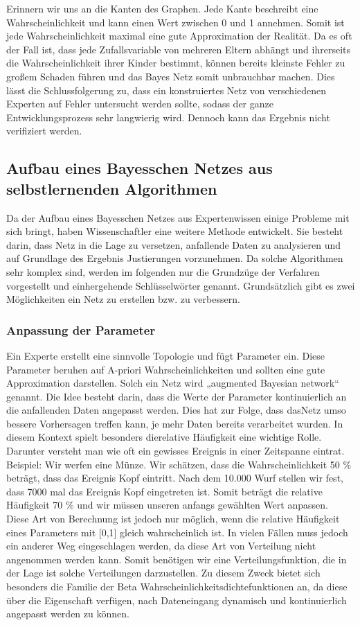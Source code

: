 Erinnern wir uns an die Kanten des Graphen. Jede Kante beschreibt eine Wahrscheinlichkeit und  kann einen Wert zwischen 0 und 1 annehmen.
Somit ist jede Wahrscheinlichkeit maximal eine gute Approximation der Realität. Da es oft der Fall ist, dass jede Zufallsvariable von
mehreren Eltern abhängt und ihrerseits die Wahrscheinlichkeit ihrer Kinder bestimmt, können bereits kleinste Fehler zu großem Schaden
führen und das Bayes Netz somit unbrauchbar machen. 
Dies lässt die Schlussfolgerung zu, dass ein konstruiertes Netz von verschiedenen Experten auf Fehler untersucht werden sollte, sodass
der ganze Entwicklungsprozess sehr langwierig wird. Dennoch kann das Ergebnis nicht verifiziert werden.

\subsection{Aufbau eines Bayesschen Netzes aus selbstlernenden Algorithmen} 
Da der Aufbau eines Bayesschen Netzes aus Expertenwissen einige Probleme mit sich bringt, haben Wissenschaftler eine weitere Methode
entwickelt. Sie besteht darin, dass Netz in die Lage zu versetzen, anfallende Daten zu analysieren und auf Grundlage des Ergebnis
Justierungen vorzunehmen. Da solche Algorithmen sehr komplex sind, werden im folgenden nur die Grundzüge der Verfahren vorgestellt
und einhergehende Schlüsselwörter genannt. Grundsätzlich gibt es zwei Möglichkeiten ein Netz zu erstellen bzw. zu verbessern.

\subsubsection{Anpassung der Parameter}
Ein Experte erstellt eine sinnvolle Topologie und fügt Parameter ein. Diese Parameter beruhen auf A-priori Wahrscheinlichkeiten und 
sollten eine gute Approximation darstellen. Solch ein Netz wird „augmented Bayesian network“ genannt. Die Idee besteht darin,
dass die Werte der Parameter kontinuierlich an die anfallenden Daten angepasst werden. Dies hat zur Folge, dass dasNetz umso bessere
Vorhersagen treffen kann, je mehr Daten bereits verarbeitet wurden. In diesem Kontext spielt besonders dierelative Häufigkeit
eine wichtige Rolle. Darunter versteht man wie oft ein gewisses Ereignis in einer Zeitspanne eintrat.\\
Beispiel: Wir werfen eine Münze. Wir schätzen, dass die Wahrscheinlichkeit 50 \% beträgt, dass das Ereignis Kopf eintritt. Nach dem 
10.000 Wurf stellen wir fest, dass 7000 mal das Ereignis Kopf eingetreten ist. Somit beträgt die relative Häufigkeit 70 \% und wir
müssen unseren anfangs gewählten Wert anpassen. \\
Diese Art von Berechnung ist jedoch nur möglich, wenn die relative Häufigkeit eines Parameters mit  [0,1] gleich wahrscheinlich ist. 
In vielen Fällen muss jedoch ein anderer Weg eingeschlagen werden, da diese Art von Verteilung nicht angenommen werden kann. Somit
benötigen wir eine Verteilungsfunktion, die in der Lage ist solche Verteilungen darzustellen.
Zu diesem Zweck bietet sich besonders die Familie der Beta Wahrscheinlichkeitsdichtefunktionen an, da diese über die Eigenschaft
verfügen, nach Dateneingang dynamisch und kontinuierlich angepasst werden zu können. 

